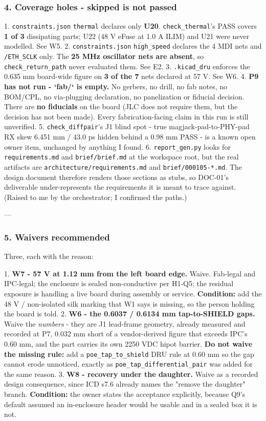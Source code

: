 \documentclass[11pt,a4paper]{article}
\begin{document}
\subsubsection*{4. Coverage holes - skipped is not passed}
1. \texttt{constraints.json} \texttt{thermal} declares only \textbf{U20}. \texttt{check\_thermal}'s PASS covers \textbf{1 of 3} dissipating parts; U22 (48 V eFuse at 1.0 A ILIM) and U21 were never modelled. See W5. 2. \texttt{constraints.json} \texttt{high\_speed} declares the 4 MDI nets and \texttt{/ETH\_SCLK} only. The \textbf{25 MHz oscillator nets are absent}, so \texttt{check\_return\_path} never evaluated them. See E2. 3. \texttt{.kicad\_dru} enforces the 0.635 mm board-wide figure on \textbf{3 of the 7} nets declared at 57 V. See W6. 4. \textbf{P9 has not run - `fab/` is empty.} No gerbers, no drill, no fab notes, no BOM/CPL, no via-plugging declaration, no panelization or fiducial decision. There are \textbf{no fiducials} on the board (JLC does not require them, but the decision has not been made). Every fabrication-facing claim in this run is still unverified. 5. \texttt{check\_diffpair}'s J1 blind spot - true magjack-pad-to-PHY-pad RX skew 6.451 mm / 43.0 ps hidden behind a 0.98 mm PASS - is a known open owner item, unchanged by anything I found. 6. \texttt{report\_gen.py} looks for \texttt{requirements.md} and \texttt{brief/brief.md} at the workspace root, but the real artifacts are \texttt{architecture/requirements.md} and \texttt{brief/00\textbar{}01\textbar{}05-{*}.md}. The design document therefore renders those sections as stubs, so DOC-01's deliverable under-represents the requirements it is meant to trace against. (Raised to me by the orchestrator; I confirmed the paths.)

---

\subsubsection*{5. Waivers recommended}
Three, each with the reason:

1. \textbf{W7 - 57 V at 1.12 mm from the left board edge.} Waive. Fab-legal and IPC-legal; the enclosure is sealed non-conductive per H1-Q5; the residual exposure is handling a live board during assembly or service. \textbf{Condition:} add the 48 V / non-isolated silk marking that W1 says is missing, so the person holding the board is told. 2. \textbf{W6 - the 0.6037 / 0.6134 mm tap-to-SHIELD gaps.} Waive the \emph{numbers} - they are J1 lead-frame geometry, already measured and recorded at P7, 0.032 mm short of a vendor-derived figure that exceeds IPC's 0.60 mm, and the part carries its own 2250 VDC hipot barrier. \textbf{Do not waive the missing rule:} add a \texttt{poe\_tap\_to\_shield} DRU rule at 0.60 mm so the gap cannot erode unnoticed, exactly as \texttt{poe\_tap\_differential\_pair} was added for the same reason. 3. \textbf{W8 - recovery under the daughter.} Waive as a recorded design consequence, since ICD s7.6 already names the "remove the daughter" branch. \textbf{Condition:} the owner states the acceptance explicitly, because Q9's default assumed an in-enclosure header would be usable and in a sealed box it is not.
\end{document}
